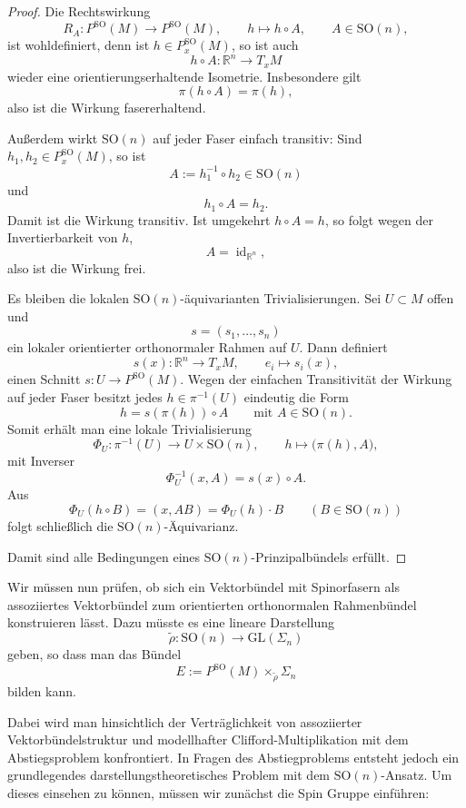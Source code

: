 \documentclass[10pt, letterpaper]{article}
\newcommand{\id}{\operatorname{id}}
\newcommand{\R}{\mathbb{R}}
\newcommand{\GL}{\mathrm{GL}}
\newcommand{\SO}{\mathrm{SO}}
\begin{document}
\begin{proof}

Die Rechtswirkung
\[
R_A:P^{\SO}(M)\to P^{\SO}(M),\qquad h\mapsto h\circ A,
\qquad A\in \SO(n),
\]
ist wohldefiniert, denn ist \(h\in P_x^{\SO}(M)\), so ist auch
\[
h\circ A:\R^n\to T_xM
\]
wieder eine orientierungserhaltende Isometrie. Insbesondere gilt
\[
\pi(h\circ A)=\pi(h),
\]
also ist die Wirkung fasererhaltend.

Außerdem wirkt \(\SO(n)\) auf jeder Faser einfach transitiv: Sind
\(h_1,h_2\in P_x^{\SO}(M)\), so ist
\[
A:=h_1^{-1}\circ h_2\in \SO(n)
\]
und
\[
h_1\circ A=h_2.
\]
Damit ist die Wirkung transitiv. Ist umgekehrt \(h\circ A=h\), so folgt wegen
der Invertierbarkeit von \(h\),
\[
A=\id_{\R^n},
\]
also ist die Wirkung frei.

Es bleiben die lokalen \(\SO(n)\)-äquivarianten Trivialisierungen. Sei
\(U\subset M\) offen und
\[
s=(s_1,\dots,s_n)
\]
ein lokaler orientierter orthonormaler Rahmen auf \(U\). Dann definiert
\[
s(x):\R^n\to T_xM,\qquad e_i\mapsto s_i(x),
\]
einen Schnitt \(s:U\to P^{\SO}(M)\). Wegen der einfachen Transitivität der
Wirkung auf jeder Faser besitzt jedes \(h\in \pi^{-1}(U)\) eindeutig die Form
\[
h=s(\pi(h))\circ A
\qquad\text{mit }A\in \SO(n).
\]
Somit erhält man eine lokale Trivialisierung
\[
\Phi_U:\pi^{-1}(U)\to U\times \SO(n),\qquad
h\mapsto \bigl(\pi(h),A\bigr),
\]
mit Inverser
\[
\Phi_U^{-1}(x,A)=s(x)\circ A.
\]
Aus
\[
\Phi_U(h\circ B)=(x,AB)=\Phi_U(h)\cdot B
\qquad (B\in \SO(n))
\]
folgt schließlich die \(\SO(n)\)-Äquivarianz.

Damit sind alle Bedingungen eines \(\SO(n)\)-Prinzipalbündels erfüllt.
\end{proof}


\bigskip


Wir müssen nun prüfen, ob sich ein Vektorbündel mit Spinorfasern als assoziiertes Vektorbündel zum orientierten orthonormalen Rahmenbündel konstruieren lässt. Dazu müsste es eine lineare Darstellung
\[
\widetilde\rho:\SO(n)\to \GL(\Sigma_n)
\]
geben, so dass man das Bündel
\[
E:=P^{\SO}(M)\times_{\widetilde\rho}\Sigma_n
\]
bilden kann.

Dabei wird man hinsichtlich der Verträglichkeit von assoziierter Vektorbündelstruktur und modellhafter Clifford-Multiplikation mit dem Abstiegsproblem konfrontiert. In Fragen des Abstiegproblems entsteht jedoch ein grundlegendes darstellungstheoretisches Problem mit dem $\SO(n)$-Ansatz. Um dieses einsehen zu können, müssen wir zunächst die Spin Gruppe einführen:
\end{document}
